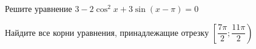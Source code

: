 \begin{ex}
	\begin{condition}
		\begin{enumcols}[label=\asbuk*)]
			\item Решите уравнение \( 3 -2\cos^2 x + 3\sin {\left(x-\pi\right)} = 0 \)
			\item Найдите все корни уравнения, принадлежащие отрезку \( \left[\dfrac{7\pi}{2};\dfrac{11\pi}{2}\right) \)
		\end{enumcols}
	\end{condition}
\end{ex}